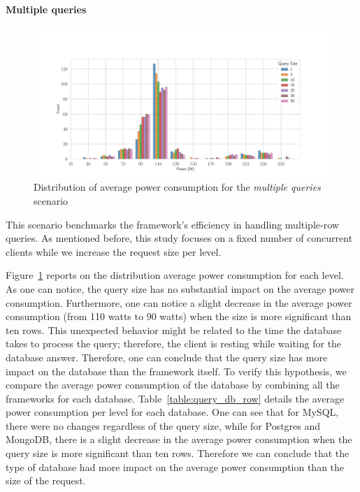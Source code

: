 \paragraph{Multiple queries}
\begin{figure}[!h]
    \centering
    \includegraphics[width=\textwidth,height=\textheight,keepaspectratio]{imgs/histogram_av_power_cpu_query}
    \caption{Distribution of average power consumption for the \emph{multiple queries} scenario }
    \label{fig:av_power_query}
\end{figure}

This scenario benchmarks the framework's efficiency in handling multiple-row queries.
As mentioned before, this study focuses on a fixed number of concurrent clients while we increase the request size per level.

Figure~\ref{fig:av_power_query} reports on the distribution average power consumption for each level.
As one can notice, the query size has no substantial impact on the average power consumption.
Furthermore, one can notice a slight decrease in the average power consumption (from 110 watts to 90 watts) when the size is more significant than ten rows.
This unexpected behavior might be related to the time the database takes to process the query; therefore, the client is resting while waiting for the database answer.
Therefore, one can conclude that the query size has more impact on the database than the framework itself.
To verify this hypothesis, we compare the average power consumption of the database by combining all the frameworks for each database.
Table~\ref{table:query_db_row} details the average power consumption per level for each database.
One can see that for MySQL, there were no changes regardless of the query size, while for Postgres and MongoDB, there is a slight decrease in the average power consumption when the query size is more significant than ten rows. Therefore we can conclude that the type of database had more impact on the average power consumption than the size of the request.


